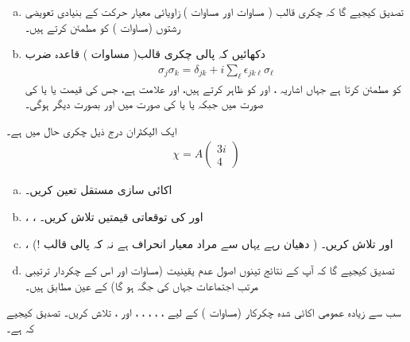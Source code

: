 \begin{enumerate}[a.]
\item
 تصدیق کیجیے گا کہ چکری قالب ( مساوات  اور مساوات ) زاویائی معیار حرکت کے بنیادی  تعویضی  رشتوں (مساوات ) کو مطمئن کرتے ہیں۔ 
\item
 دکھائیں کہ پالی چکری قالب( مساوات ) قاعدہ ضرب
\begin{align}
\sigma_j\sigma_k = \delta_{jk}+i\sum_{\ell} \epsilon_{jk\ell}\sigma_{\ell}
\end{align}
 کو مطمئن کرتا ہے جہاں اشاریہ ،  اور  کو ظاہر کرتے ہیں، اور  علامت  ہے، جس کی قیمت  یا  یا  کی صورت میں  جبکہ  یا  یا  کی صورت میں  اور بصورت دیگر  ہوگی۔ 
 \end{enumerate}
ایک الیکٹران درج ذیل چکری حال میں ہے۔
\begin{align*}
\chi =A\begin{pmatrix}
3i \\ 4
\end{pmatrix} 
\end{align*}
\begin{enumerate}[a.]
\item
اکائی سازی مستقل  تعین کریں۔
\item
 ، ، اور  کی توقعاتی قیمتیں تلاش کریں۔
\item 
{} ،  اور  تلاش کریں۔ ( دھیان رہے یہاں  سے مراد معیار انحراف ہے نہ کہ پالی قالب !)
\item 
 تصدیق کیجیے گا کہ آپ کے نتائج تینوں اصول عدم یقینیت (مساوات  اور اس کے چکردار ترتیبی مرتب اجتماعات جہاں  کی جگہ  ہو گا) کے عین مطابق ہیں۔
\end{enumerate}
 سب سے زیادہ عمومی اکائی شدہ چکرکار  (مساوات ) کے لیے ، ، ، ، ، اور ،
 تلاش کریں۔ تصدیق کیجیے کہ  ہے۔ 
